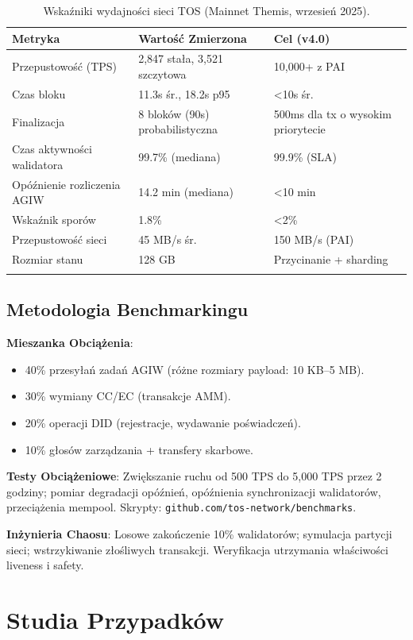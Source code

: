 \documentclass[11pt]{article}
\begin{document}
\begin{longtable}{@{}p{}p{}p{}@{}}
\toprule
\textbf{Metryka} & \textbf{Wartość Zmierzona} & \textbf{Cel (v4.0)} \\\midrule
Przepustowość (TPS) & 2,847 stała, 3,521 szczytowa & 10,000+ z PAI \\
Czas bloku & 11.3s śr., 18.2s p95 & <10s śr. \\
Finalizacja & 8 bloków (90s) probabilistyczna & 500ms dla tx o wysokim priorytecie \\
Czas aktywności walidatora & 99.7\% (mediana) & 99.9\% (SLA) \\
Opóźnienie rozliczenia AGIW & 14.2 min (mediana) & <10 min \\
Wskaźnik sporów & 1.8\% & <2\% \\
Przepustowość sieci & 45 MB/s śr. & 150 MB/s (PAI) \\
Rozmiar stanu & 128 GB & Przycinanie + sharding \\
\bottomrule
\caption{Wskaźniki wydajności sieci TOS (Mainnet Themis, wrzesień 2025).}
\end{longtable}

\subsection{Metodologia Benchmarkingu}

\textbf{Mieszanka Obciążenia}:
\begin{itemize}[noitemsep]
  \item 40\% przesyłań zadań AGIW (różne rozmiary payload: 10 KB--5 MB).
  \item 30\% wymiany CC/EC (transakcje AMM).
  \item 20\% operacji DID (rejestracje, wydawanie poświadczeń).
  \item 10\% głosów zarządzania + transfery skarbowe.
\end{itemize}

\textbf{Testy Obciążeniowe}: Zwiększanie ruchu od 500 TPS do 5,000 TPS przez 2 godziny; pomiar degradacji opóźnień, opóźnienia synchronizacji walidatorów, przeciążenia mempool. Skrypty: \texttt{github.com/tos-network/benchmarks}.

\textbf{Inżynieria Chaosu}: Losowe zakończenie 10\% walidatorów; symulacja partycji sieci; wstrzykiwanie złośliwych transakcji. Weryfikacja utrzymania właściwości liveness i safety.

\section{Studia Przypadków}
\label{sec:case-studies}
\end{document}
